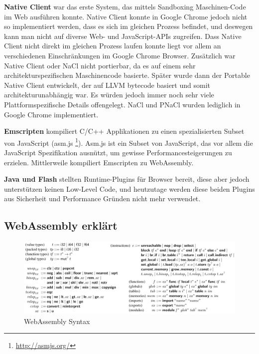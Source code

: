 \begin{flushleft}

\textbf{Native Client} war das erste System, das mittels Sandboxing Maschinen-Code \autocite[]{Yee2010} im Web ausführen konnte. Native Client konnte in Google Chrome jedoch nicht so implementiert werden, dass es sich im gleichen Prozess befindet, und deswegen kann man nicht auf diverse Web- und JavaScript-APIs zugreifen. Dass Native Client nicht direkt im gleichen Prozess laufen konnte liegt vor allem an verschiedenen Einschränkungen im Google Chrome Browser. \autocite[]{Haas2017} Zusätzlich war Native Client oder NaCl nicht portierbar, da es auf einem sehr architekturspezifischen Maschinencode basierte. Später wurde dann der Portable Native Client \autocite[]{Donovan2010} entwickelt, der auf LLVM bytecode basiert und somit architekturunabhängig war. Es würden jedoch immer noch sehr viele Plattformspezifische Details offengelegt. NaCl und PNaCl wurden lediglich in Google Chrome implementiert.

\hfill \break

\textbf{Emscripten} kompiliert C/C++ Applikationen zu einen spezialisierten Subset von JavaScript (asm.js \footnote{\url{http://asmjs.org/}}). Asm.js ist ein Subset von JavaScript, das vor allem die JavaScript Spezifikation ausnützt, um gewisse Performancesteigerungen zu erzielen. Mittlerweile kompiliert Emscripten zu WebAssembly. \autocite[]{Zakai2011}

\hfill \break

\textbf{Java und Flash} stellten Runtime-Plugins für Browser bereit, diese aber jedoch unterstützen keinen Low-Level Code, und heutzutage werden diese beiden Plugins aus Sicherheit und Performance Gründen nicht mehr verwendet. \autocite[]{Haas2017}

\end{flushleft}


\subsection{WebAssembly erklärt}

\begin{figure}[t]
	\centering
	\includegraphics[width=1\textwidth]{images/WebAssemblySyntax.png}
	\caption{
		WebAssembly Syntax \autocite[]{Haas2017}
	}
	\label{figure:WASyntax}
\end{figure}

